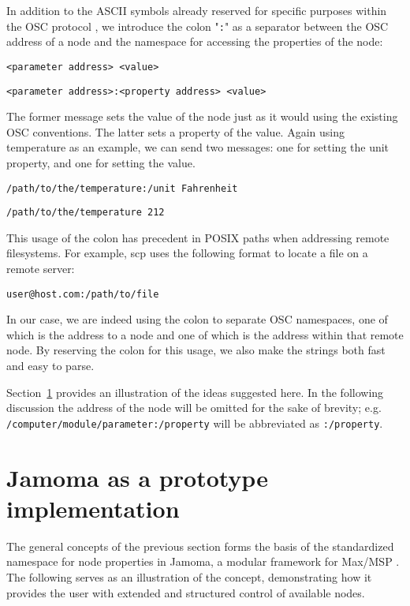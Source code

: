 \documentclass{sig-alternate}
\begin{document}
In addition to the ASCII symbols already reserved for specific purposes within the OSC protocol \cite{Wright:1997}, we introduce the colon "\texttt{:}" as a separator between the OSC address of a node and the namespace for accessing the properties of the node:

\texttt{<parameter address> <value>}

\texttt{<parameter address>:<property address> <value>}

The former message sets the value of the node just as it would using the existing OSC conventions. The latter sets a property of the value.  Again using temperature as an example, we can send two messages: one for setting the unit property, and one for setting the value.

\texttt{/path/to/the/temperature:/unit Fahrenheit}

\texttt{/path/to/the/temperature 212}

This usage of the colon has precedent in POSIX paths when addressing remote filesystems.  For example, scp uses the following format to locate a file on a remote server:

\texttt{user@host.com:/path/to/file}

In our case, we are indeed using the colon to separate OSC namespaces, one of which is the address to a node and one of which is the address within that remote node.  By reserving the colon for this usage, we also make the strings both fast and easy to parse.

Section~\ref{sec:prototype_implementation} provides an illustration of the ideas suggested here. In the following discussion the address of the node will be omitted for the sake of brevity; e.g.\\ 
\texttt{/computer/module/parameter:/property}  
will be abbreviated as \texttt{:/property}.







\section{Jamoma as a prototype implementation} %
\label{sec:prototype_implementation}

The general concepts of the previous section forms the basis of the standardized namespace for node properties in Jamoma, a modular framework for Max/MSP \cite{Place:2006}. The following serves as an illustration of the concept, demonstrating how it provides the user with extended and structured control of available nodes.
\end{document}
